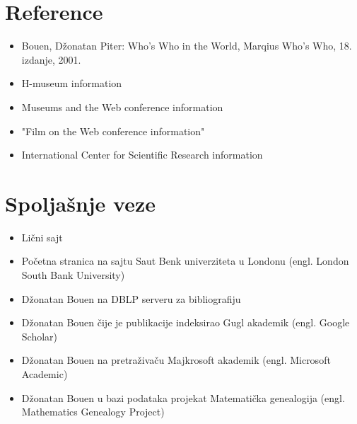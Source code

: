 \documentclass[a4paper]{article}
\begin{document}
\section{Reference}
\itemize

\begin{itemize}

\item Bouen, Džonatan Piter: Who's Who in the World, Marqius Who's Who, 18. izdanje, 2001.
\item H-museum information
\item Museums and the Web conference information
\item "Film on the Web conference information"
\item International Center for Scientific Research information
\end{itemize}

\section{Spoljašnje veze}
\itemize

\begin{itemize}

\item Lični sajt
\item Početna stranica na sajtu Saut Benk univerziteta u Londonu (engl. London South Bank University)
\item Džonatan Bouen na DBLP serveru za bibliografiju
\item Džonatan Bouen čije je publikacije indeksirao Gugl akademik (engl. Google Scholar)
\item Džonatan Bouen na pretraživaču Majkrosoft akademik (engl. Microsoft Academic)
\item Džonatan Bouen u bazi podataka projekat Matematička genealogija (engl. Mathematics Genealogy Project)
\end{itemize}
\end{document}
